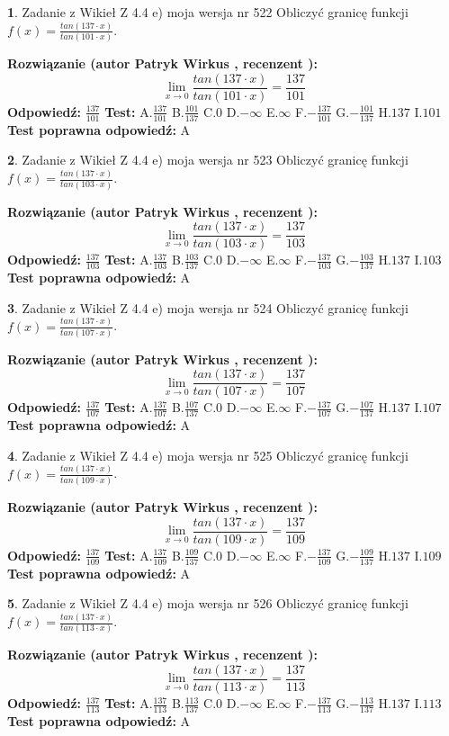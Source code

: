 \documentclass[12pt, a4paper]{article}
\theoremstyle{definition} %
\newtheorem{zad}{}
\newcommand{\zadStart}[1]{\begin{zad}#1\newline}
\newcommand{\zadStop}{\end{zad}}
\newcommand{\rozwStart}[2]{\noindent \textbf{Rozwiązanie (autor #1 , recenzent #2): }\newline}
\newcommand{\rozwStop}{\newline}
\newcommand{\odpStart}{\noindent \textbf{Odpowiedź:}\newline}
\newcommand{\odpStop}{\newline}
\newcommand{\testStart}{\noindent \textbf{Test:}\newline}
\newcommand{\testStop}{\newline}
\newcommand{\kluczStart}{\noindent \textbf{Test poprawna odpowiedź:}\newline}
\newcommand{\kluczStop}{\newline}
\begin{document}
\zadStart{Zadanie z Wikieł Z 4.4 e) moja wersja nr 522}
Obliczyć granicę funkcji $f(x)=\frac{tan(137\cdot x)}{tan(101\cdot x)}$.
\zadStop
\rozwStart{Patryk Wirkus}{}
$$\lim\limits_{x\to 0}\frac{tan(137\cdot x)}{tan(101\cdot x)}=
\frac{137}{101}$$
\rozwStop
\odpStart
$\frac{137}{101}$
\odpStop
\testStart
A.$\frac{137}{101}$
B.$\frac{101}{137}$
C.$0$
D.$-\infty$
E.$\infty$
F.$-\frac{137}{101}$
G.$-\frac{101}{137}$
H.$137$
I.$101$
\testStop
\kluczStart
A
\kluczStop



\zadStart{Zadanie z Wikieł Z 4.4 e) moja wersja nr 523}
Obliczyć granicę funkcji $f(x)=\frac{tan(137\cdot x)}{tan(103\cdot x)}$.
\zadStop
\rozwStart{Patryk Wirkus}{}
$$\lim\limits_{x\to 0}\frac{tan(137\cdot x)}{tan(103\cdot x)}=
\frac{137}{103}$$
\rozwStop
\odpStart
$\frac{137}{103}$
\odpStop
\testStart
A.$\frac{137}{103}$
B.$\frac{103}{137}$
C.$0$
D.$-\infty$
E.$\infty$
F.$-\frac{137}{103}$
G.$-\frac{103}{137}$
H.$137$
I.$103$
\testStop
\kluczStart
A
\kluczStop



\zadStart{Zadanie z Wikieł Z 4.4 e) moja wersja nr 524}
Obliczyć granicę funkcji $f(x)=\frac{tan(137\cdot x)}{tan(107\cdot x)}$.
\zadStop
\rozwStart{Patryk Wirkus}{}
$$\lim\limits_{x\to 0}\frac{tan(137\cdot x)}{tan(107\cdot x)}=
\frac{137}{107}$$
\rozwStop
\odpStart
$\frac{137}{107}$
\odpStop
\testStart
A.$\frac{137}{107}$
B.$\frac{107}{137}$
C.$0$
D.$-\infty$
E.$\infty$
F.$-\frac{137}{107}$
G.$-\frac{107}{137}$
H.$137$
I.$107$
\testStop
\kluczStart
A
\kluczStop



\zadStart{Zadanie z Wikieł Z 4.4 e) moja wersja nr 525}
Obliczyć granicę funkcji $f(x)=\frac{tan(137\cdot x)}{tan(109\cdot x)}$.
\zadStop
\rozwStart{Patryk Wirkus}{}
$$\lim\limits_{x\to 0}\frac{tan(137\cdot x)}{tan(109\cdot x)}=
\frac{137}{109}$$
\rozwStop
\odpStart
$\frac{137}{109}$
\odpStop
\testStart
A.$\frac{137}{109}$
B.$\frac{109}{137}$
C.$0$
D.$-\infty$
E.$\infty$
F.$-\frac{137}{109}$
G.$-\frac{109}{137}$
H.$137$
I.$109$
\testStop
\kluczStart
A
\kluczStop



\zadStart{Zadanie z Wikieł Z 4.4 e) moja wersja nr 526}
Obliczyć granicę funkcji $f(x)=\frac{tan(137\cdot x)}{tan(113\cdot x)}$.
\zadStop
\rozwStart{Patryk Wirkus}{}
$$\lim\limits_{x\to 0}\frac{tan(137\cdot x)}{tan(113\cdot x)}=
\frac{137}{113}$$
\rozwStop
\odpStart
$\frac{137}{113}$
\odpStop
\testStart
A.$\frac{137}{113}$
B.$\frac{113}{137}$
C.$0$
D.$-\infty$
E.$\infty$
F.$-\frac{137}{113}$
G.$-\frac{113}{137}$
H.$137$
I.$113$
\testStop
\kluczStart
A
\kluczStop
\end{document}

